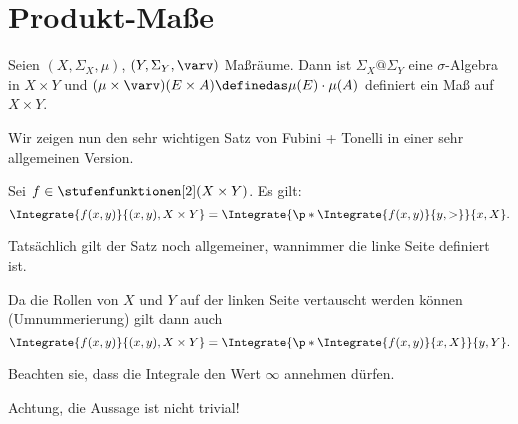 \section{Produkt-Maße}
Seien \( (X,\Sigma_X,\mu) \), \( (Y,\Sigma_Y,\varv) \) Maßräume. Dann ist \( \Sigma_X@ \Sigma_Y \) eine \( \sigma \)-Algebra in \( X\times Y \) und \( (\mu\times \varv)(E\times A)\definedas \mu(E)\cdot \mu(A) \) definiert ein Maß auf \( X\times Y \).

Wir zeigen nun den sehr wichtigen Satz von Fubini + Tonelli in einer sehr allgemeinen Version.
\begin{satz}[Fubini]\label{fubini}
  Sei \( f\in \stufenfunktionen[2](X\times Y) \). Es gilt:
  \begin{equation*}
    \Integrate{f(x,y)}{{(x,y)},{X\times Y}}=\Integrate{\p*{\Integrate{f(x,y)}{y,>}}}{x,X}.
  \end{equation*}
\end{satz}
\begin{bemerkung*}
  Tatsächlich gilt der Satz noch allgemeiner, wannimmer die linke Seite definiert ist.
\end{bemerkung*}
\begin{bemerkung*}
  Da die Rollen von \( X \) und \( Y \) auf der linken Seite vertauscht werden können (Umnummerierung) gilt dann auch
  \begin{equation*}
    \Integrate{f(x,y)}{{(x,y)},{X\times Y}}=\Integrate{\p*{\Integrate{f(x,y)}{x,X}}}{y,Y}.
  \end{equation*}
\end{bemerkung*}
\begin{bemerkung*}
  Beachten sie, dass die Integrale den Wert \( \infty \) annehmen dürfen.
\end{bemerkung*}
Achtung, die Aussage ist nicht trivial!
